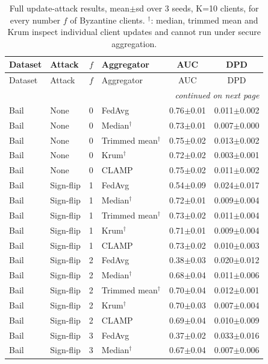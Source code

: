 \footnotesize
\setlength{\tabcolsep}{3pt}
\begin{longtable}{llclcc}
\caption{Full update-attack results, mean$\pm$sd over 3 seeds, K=10 clients, for every number $f$ of Byzantine clients. $^\dagger$: median, trimmed mean and Krum inspect individual client updates and cannot run under secure aggregation.}\label{tab:e3_full}\\
\toprule
Dataset & Attack & $f$ & Aggregator & AUC & DPD \\
\midrule
\endfirsthead
\toprule
Dataset & Attack & $f$ & Aggregator & AUC & DPD \\
\midrule
\endhead
\midrule
\multicolumn{6}{r}{\textit{continued on next page}} \\
\endfoot
\bottomrule
\endlastfoot
Bail & None & 0 & FedAvg & 0.76$\pm$0.01 & 0.011$\pm$0.002 \\
Bail & None & 0 & Median$^\dagger$ & 0.73$\pm$0.01 & 0.007$\pm$0.000 \\
Bail & None & 0 & Trimmed mean$^\dagger$ & 0.75$\pm$0.02 & 0.013$\pm$0.002 \\
Bail & None & 0 & Krum$^\dagger$ & 0.72$\pm$0.02 & 0.003$\pm$0.001 \\
Bail & None & 0 & CLAMP & 0.75$\pm$0.02 & 0.011$\pm$0.002 \\
Bail & Sign-flip & 1 & FedAvg & 0.54$\pm$0.09 & 0.024$\pm$0.017 \\
Bail & Sign-flip & 1 & Median$^\dagger$ & 0.72$\pm$0.01 & 0.009$\pm$0.004 \\
Bail & Sign-flip & 1 & Trimmed mean$^\dagger$ & 0.73$\pm$0.02 & 0.011$\pm$0.004 \\
Bail & Sign-flip & 1 & Krum$^\dagger$ & 0.71$\pm$0.01 & 0.009$\pm$0.004 \\
Bail & Sign-flip & 1 & CLAMP & 0.73$\pm$0.02 & 0.010$\pm$0.003 \\
Bail & Sign-flip & 2 & FedAvg & 0.38$\pm$0.03 & 0.020$\pm$0.012 \\
Bail & Sign-flip & 2 & Median$^\dagger$ & 0.68$\pm$0.04 & 0.011$\pm$0.006 \\
Bail & Sign-flip & 2 & Trimmed mean$^\dagger$ & 0.70$\pm$0.04 & 0.012$\pm$0.001 \\
Bail & Sign-flip & 2 & Krum$^\dagger$ & 0.70$\pm$0.03 & 0.007$\pm$0.004 \\
Bail & Sign-flip & 2 & CLAMP & 0.69$\pm$0.04 & 0.010$\pm$0.009 \\
Bail & Sign-flip & 3 & FedAvg & 0.37$\pm$0.02 & 0.033$\pm$0.016 \\
Bail & Sign-flip & 3 & Median$^\dagger$ & 0.67$\pm$0.04 & 0.007$\pm$0.006 \\

\end{longtable}
